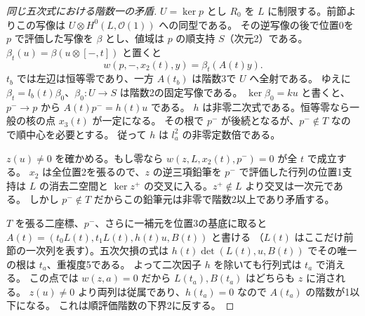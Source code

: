 \begin{proof}[同じ五次式における階数一の矛盾]
$U=\ker p$ とし $R_0$ を $L$ に制限する。前節よりこの写像は $U\otimes H^0(L,\mathcal O(1))$ への同型である。
その逆写像の後で位置0を $p$ で評価した写像を $\beta$ とし、値域は $p$ の順支持 $S$（次元2）である。
$\beta_t(u)=\beta(u\otimes[-,t])$ と置くと
\[
             w(p,-,x_2(t),y)=\beta_t(A(t)y).
\]
$t_b$ では左辺は恒等零であり、一方 $A(t_b)$ は階数3で $U$ へ全射である。
ゆえに $\beta_t=l_b(t)\beta_0$、$\beta_0:U\to S$ は階数2の固定写像である。
$\ker\beta_0=ku$ と書くと、$p^-\to p$ から $A(t)p^-=h(t)u$ である。
$h$ は非零二次式である。恒等零なら一般の核の点 $x_3(t)$ が一定になる。
その根で $p^-$ が後続となるが、$p^-\notin T$ なので順中心を必要とする。
従って $h$ は $l_a^2$ の非零定数倍である。

$z(u)\ne0$ を確かめる。もし零なら $w(z,L,x_2(t),p^-)=0$ が全 $t$ で成立する。
$x_2$ は全位置2を張るので、$z$ の逆三項鉛筆を $p^-$ で評価した行列の位置1支持は
$L$ の消去二空間と $\ker z^+$ の交叉に入る。$z^+\notin L$ より交叉は一次元である。
しかし $p^-\notin T$ だからこの鉛筆元は非零で階数2以上であり矛盾する。

$T$ を張る二座標、$p^-$、さらに一補元を位置3の基底に取ると
$A(t)=(t_0L(t),t_1L(t),h(t)u,B(t))$ と書ける
（$L(t)$ はここだけ前節の一次列を表す）。五次欠損の式は
$h(t)\det(L(t),u,B(t))$ でその唯一の根は $t_a$、重複度5である。
よって二次因子 $h$ を除いても行列式は $t_a$ で消える。
この点では $w(z,a)=0$ だから $L(t_a),B(t_a)$ はどちらも $z$ に消される。
$z(u)\ne0$ より両列は従属であり、$h(t_a)=0$ なので $A(t_a)$ の階数が1以下になる。
これは順評価階数の下界2に反する。
\end{proof}


